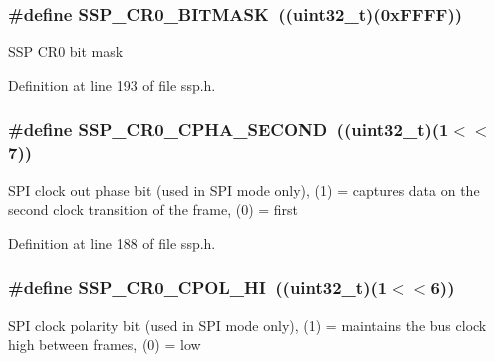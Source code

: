 \subsubsection[{\texorpdfstring{S\+S\+P\+\_\+\+C\+R0\+\_\+\+B\+I\+T\+M\+A\+SK}{SSP_CR0_BITMASK}}]{\setlength{\rightskip}{0pt plus 5cm}\#define S\+S\+P\+\_\+\+C\+R0\+\_\+\+B\+I\+T\+M\+A\+SK~(({\bf uint32\+\_\+t})(0x\+F\+F\+F\+F))}\hypertarget{group___s_s_p___private___macros_ga90be93bebdbdfee011d90ea6e054260a}{}\label{group___s_s_p___private___macros_ga90be93bebdbdfee011d90ea6e054260a}
S\+SP C\+R0 bit mask 

Definition at line 193 of file ssp.\+h.

\subsubsection[{\texorpdfstring{S\+S\+P\+\_\+\+C\+R0\+\_\+\+C\+P\+H\+A\+\_\+\+S\+E\+C\+O\+ND}{SSP_CR0_CPHA_SECOND}}]{\setlength{\rightskip}{0pt plus 5cm}\#define S\+S\+P\+\_\+\+C\+R0\+\_\+\+C\+P\+H\+A\+\_\+\+S\+E\+C\+O\+ND~(({\bf uint32\+\_\+t})(1$<$$<$7))}\hypertarget{group___s_s_p___private___macros_gae4150d0b2513ff70568be15c2170c9ea}{}\label{group___s_s_p___private___macros_gae4150d0b2513ff70568be15c2170c9ea}
S\+PI clock out phase bit (used in S\+PI mode only), (1) = captures data on the second clock transition of the frame, (0) = first 

Definition at line 188 of file ssp.\+h.

\subsubsection[{\texorpdfstring{S\+S\+P\+\_\+\+C\+R0\+\_\+\+C\+P\+O\+L\+\_\+\+HI}{SSP_CR0_CPOL_HI}}]{\setlength{\rightskip}{0pt plus 5cm}\#define S\+S\+P\+\_\+\+C\+R0\+\_\+\+C\+P\+O\+L\+\_\+\+HI~(({\bf uint32\+\_\+t})(1$<$$<$6))}\hypertarget{group___s_s_p___private___macros_ga36d7ad75edb14d318d710f964384f466}{}\label{group___s_s_p___private___macros_ga36d7ad75edb14d318d710f964384f466}
S\+PI clock polarity bit (used in S\+PI mode only), (1) = maintains the bus clock high between frames, (0) = low 

